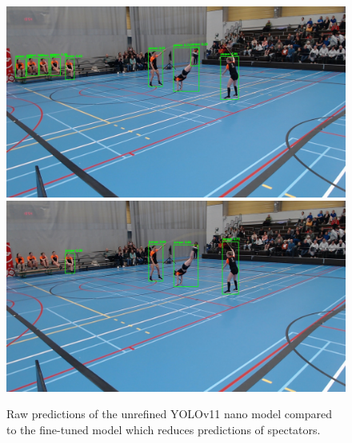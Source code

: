 \begin{figure}
    \centering
    \includegraphics[width=0.95\linewidth]{img/1267_292_boxes}
    \includegraphics[width=0.95\linewidth]{img/1267_292_boxes_reduced_spectators}
    \caption[raw vs fine-tuned YOLOv11 nano model predictions]{Raw predictions of the unrefined YOLOv11 nano model compared to the fine-tuned model which reduces predictions of spectators.}
    \label{fig:raw-vs-fine-tuned-boxes}
\end{figure}

